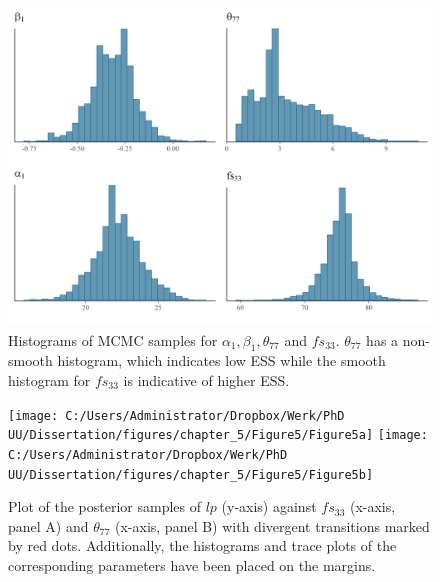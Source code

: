 \documentclass[openright,titlepage,12pt,a4paper]{book}
\begin{document}
\begin{figure}

{\centering \includegraphics[width=0.7\linewidth]{figures/chapter_5/Figure4} 

}

\caption{Histograms of MCMC samples for $\alpha_1, \beta_1, \theta_{77}$ and $fs_{33}$. $\theta_{77}$ has a non-smooth histogram, which indicates low ESS while the smooth histogram for $fs_{33}$ is indicative of higher ESS.}\label{fig:ch05fig4}
\end{figure}

\newpage

\begin{figure}[H]

{\centering \texttt{[image: C:/Users/Administrator/Dropbox/Werk/PhD UU/Dissertation/figures/chapter\_5/Figure5/Figure5a]} \texttt{[image: C:/Users/Administrator/Dropbox/Werk/PhD UU/Dissertation/figures/chapter\_5/Figure5/Figure5b]} 

}

\caption{Plot of the posterior samples of $lp$ (y-axis) against $fs_{33}$ (x-axis, panel A) and $\theta_{77}$ (x-axis, panel B) with divergent transitions marked by red dots. Additionally, the histograms and trace plots of the corresponding parameters have been placed on the margins.}\label{fig:ch05fig5}
\end{figure}
\end{document}
